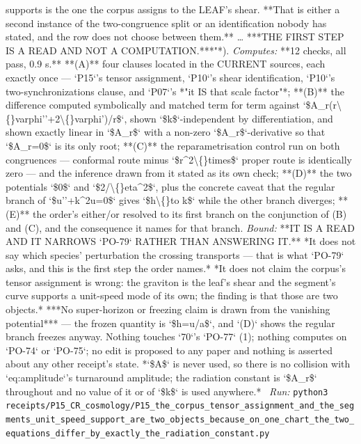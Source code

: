 \begin{description}
supports is the one the corpus assigns to the LEAF's shear. **That is either a second instance of the two-congruence split or an identification nobody has stated, and the row does not choose between them.** \ldots{} ***THE FIRST STEP IS A READ AND NOT A COMPUTATION.***"*). 
\emph{Computes:} **12 checks, all pass, 0.9 s.** **(A)** four clauses located in the CURRENT sources, each exactly once --- `P15`'s tensor assignment, `P10`'s shear identification, `P10`'s two-synchronizations clause, and `P07`'s *"it IS that scale factor"*; **(B)** the difference computed symbolically and matched term for term against `\$A\_r(r\textbackslash\{\}varphi''+2\textbackslash\{\}varphi')/r\$`, shown `\$k\$`-independent by differentiation, and shown exactly linear in `\$A\_r\$` with a non-zero `\$A\_r\$`-derivative so that `\$A\_r=0\$` is its only root; **(C)** the reparametrisation control run on both congruences --- conformal route minus `\$r\textasciicircum{}2\textbackslash\{\}times\$` proper route is identically zero --- and the inference drawn from it stated as its own check; **(D)** the two potentials `\$0\$` and `\$2/\textbackslash\{\}eta\textasciicircum{}2\$`, plus the concrete caveat that the regular branch of `\$u''+k\textasciicircum{}2u=0\$` gives `\$h\textbackslash\{\}to k\$` while the other branch diverges; **(E)** the order's either/or resolved to its first branch on the conjunction of (B) and (C), and the consequence it names for that branch.
 \emph{Bound:}  **IT IS A READ AND IT NARROWS `PO-79` RATHER THAN ANSWERING IT.**  *It does not say which species' perturbation the crossing transports --- that is what `PO-79` asks, and this is the first step the order names.*  *It does not claim the corpus's tensor assignment is wrong: the graviton is the leaf's shear and the segment's curve supports a unit-speed mode of its own; the finding is that those are two objects.*  ***No super-horizon or freezing claim is drawn from the vanishing potential*** --- the frozen quantity is `\$h=u/a\$`, and `(D)` shows the regular branch freezes anyway.  Nothing touches `70`'s `PO-77` (1); nothing computes on `PO-74` or `PO-75`; no edit is proposed to any paper and nothing is asserted about any other receipt's state.  *`\$A\$` is never used, so there is no collision with `eq:amplitude`'s turnaround amplitude; the radiation constant is `\$A\_r\$` throughout and no value of it or of `\$k\$` is used anywhere.*
\ \emph{Run:} \texttt{python3 receipts/P15\_CR\_cosmology/P15\_the\_corpus\_tensor\_assignment\_and\_the\_segments\_unit\_speed\_support\_are\_two\_objects\_because\_on\_one\_chart\_the\_two\_equations\_differ\_by\_exactly\_the\_radiation\_constant.py}

\end{description}
